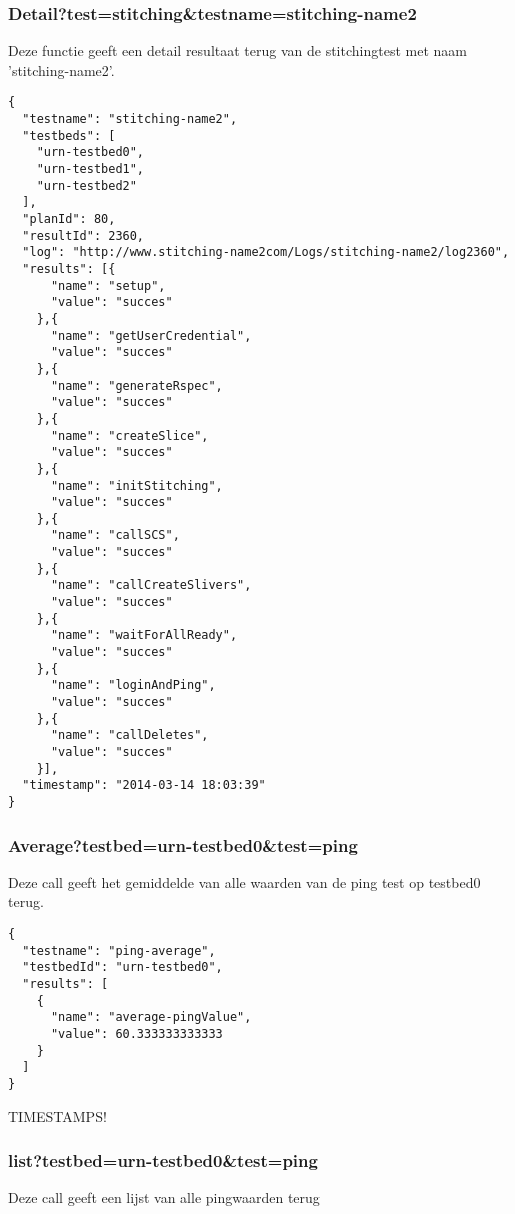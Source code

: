 \documentclass[11pt]{article}
\begin{document}
\subsubsection{Detail?test=stitching\&testname=stitching-name2}
Deze functie geeft een detail resultaat terug van de stitchingtest met naam 'stitching-name2'.
\begin{verbatim}
{
  "testname": "stitching-name2",
  "testbeds": [
    "urn-testbed0",
    "urn-testbed1",
    "urn-testbed2"
  ],
  "planId": 80,
  "resultId": 2360,
  "log": "http://www.stitching-name2com/Logs/stitching-name2/log2360",
  "results": [{
      "name": "setup",
      "value": "succes"
    },{
      "name": "getUserCredential",
      "value": "succes"
    },{
      "name": "generateRspec",
      "value": "succes"
    },{
      "name": "createSlice",
      "value": "succes"
    },{
      "name": "initStitching",
      "value": "succes"
    },{
      "name": "callSCS",
      "value": "succes"
    },{
      "name": "callCreateSlivers",
      "value": "succes"
    },{
      "name": "waitForAllReady",
      "value": "succes"
    },{
      "name": "loginAndPing",
      "value": "succes"
    },{
      "name": "callDeletes",
      "value": "succes"
    }],
  "timestamp": "2014-03-14 18:03:39"
}
\end{verbatim}
\clearpage

\subsubsection{Average?testbed=urn-testbed0\&test=ping}
Deze call geeft het gemiddelde van alle waarden van de ping test op testbed0 terug.
\begin{verbatim}
{
  "testname": "ping-average",
  "testbedId": "urn-testbed0",
  "results": [
    {
      "name": "average-pingValue",
      "value": 60.333333333333
    }
  ]
}
\end{verbatim}

TIMESTAMPS!

\subsubsection{list?testbed=urn-testbed0\&test=ping}
Deze call geeft een lijst van alle pingwaarden terug
\end{document}
